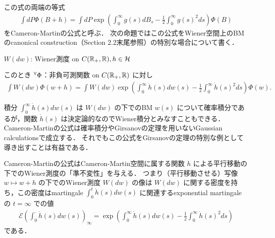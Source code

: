\documentclass{jsarticle}
\begin{document}
この式の両端の等式
\begin{align}
    \int dP\Phi(B+h)
    = \int dP\exp\left(\int_0^\infty g(s)dB_s-\frac{1}{2}\int_0^\infty g(s)^2 ds\right)\Phi(B)
\end{align}
をCameron-Martinの公式と呼ぶ．
次の命題ではこの公式をWiener空間上のBMのcanonical construction（Section 2.2末尾参照）の特別な場合について書く．

\begin{shadebox}
    \begin{prop}
    \label{thm:524}
        $W(dw)$: Wiener測度 on $C(\mathbb{R}_+,\mathbb{R}), h\in\mathcal{H}$

        このとき ${}^{\forall} \Phi$：非負可測関数 on $C(\mathbb{R}_+,\mathbb{R})$ に対し
        \begin{align}
            \int W(dw)\Phi(w+h)
            = \int W(dw)\exp\left(\int_0^\infty \dot{h}(s)dw(s)-\frac{1}{2}\int_0^\infty \dot{h}(s)^2 ds\right)\Phi(w).
        \end{align}
    \end{prop}  
\end{shadebox}

\begin{remark*}
    積分 $\int_0^\infty\dot{h}(s)dw(s)$ は $W(dw)$ の下でのBM $w(s)$ について確率積分であるが，関数 $\dot{h}(s)$ は決定論的なのでWiener積分とみなすこともできる．
    Cameron-Martinの公式は確率積分やGirsanovの定理を用いないGaussian calculationsで成立する．
    それでもこの公式をGirsanovの定理の特別な例として導き出すことは有益である．

    Cameron-Martinの公式はCameron-Martin空間に属する関数 $h$ による平行移動の下でのWiener測度の「準不変性」を与える．
    つまり（平行移動させる）写像 $w\mapsto w+h$ の下でのWiener測度 $W(dw)$ の像は $W(dw)$ に関する密度を持ち，この密度はmartingale $\int_0^t \dot{h}(s)dw(s)$ に関連するexponential martingaleの $t=\infty$ での値
    \begin{align}
        \mathcal{E}\left(\int_0^{\cdot}\dot{h}(s)dw(s)\right)_\infty
        = \exp\left(\int_0^\infty \dot{h}(s)dw(s)-\frac{1}{2}\int_0^\infty \dot{h}(s)^2 ds\right)
    \end{align}
    である．
\end{remark*}
\end{document}
